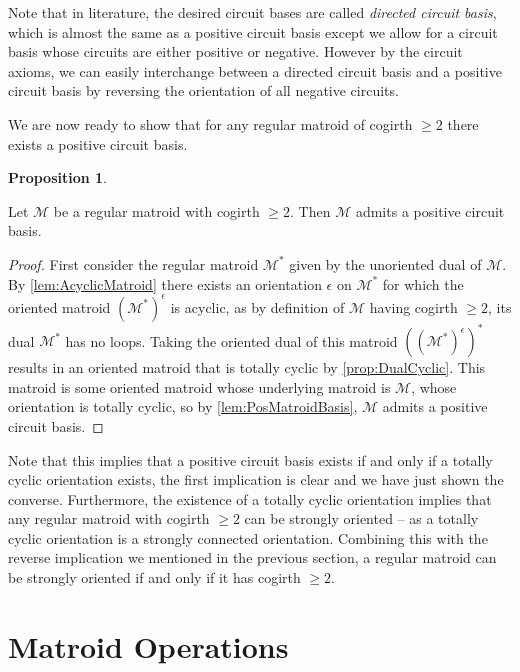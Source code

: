\documentclass[12pt]{report}
\theoremstyle{definition}
\newtheorem{proposition}[theorem]{Proposition}
\def\calM{\mathcal M}
\theoremstyle{upright}
\begin{document}
Note that in literature, the desired circuit bases are called \textit{directed circuit basis}, which is almost the same as a positive circuit basis except we allow for a circuit basis whose circuits are either positive or negative.
However by the circuit axioms, we can easily interchange between a directed circuit basis and a positive circuit basis by reversing the orientation of all negative circuits.

We are now ready to show that for any regular matroid of cogirth $\geq2$ there exists a positive circuit basis.

\begin{proposition}\label{prop:PosCircuitBasisMatroid}

    Let $\calM$ be a regular matroid with cogirth $\geq2$.
    Then $\calM$ admits a positive circuit basis.
    
\end{proposition}

\begin{proof}

    First consider the regular matroid $\calM^*$ given by the unoriented dual of $\calM$.
    By \cref{lem:AcyclicMatroid} there exists an orientation $\epsilon$ on $\calM^*$ for which the oriented matroid $(\calM^*)^\epsilon$ is acyclic, as by definition of $\calM$ having cogirth $\geq2$, its dual $\calM^*$ has no loops.
    Taking the oriented dual of this matroid $((\calM^*)^\epsilon)^*$ results in an oriented matroid that is totally cyclic by \cref{prop:DualCyclic}.
    This matroid is some oriented matroid whose underlying matroid is $\calM$, whose orientation is totally cyclic, so by \cref{lem:PosMatroidBasis}, $\calM$ admits a positive circuit basis.

\end{proof}

Note that this implies that a positive circuit basis exists if and only if a totally cyclic orientation exists, the first implication is clear and we have just shown the converse.
Furthermore, the existence of a totally cyclic orientation implies that any regular matroid with cogirth $\geq2$ can be strongly oriented -- as a totally cyclic orientation is a strongly connected orientation.
Combining this with the reverse implication we mentioned in the previous section, a regular matroid can be strongly oriented if and only if it has cogirth $\geq2$.

\section{Matroid Operations}
\label{sec:MatroidOperations}
\end{document}
